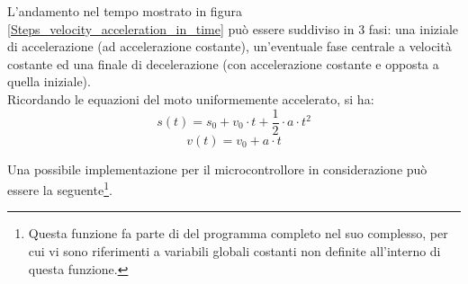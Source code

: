 \documentclass[12pt]{article}
\begin{document}
        \noindent
        L'andamento nel tempo mostrato in figura \ref{Steps_velocity_acceleration_in_time} può essere suddiviso in 3 fasi: una iniziale di accelerazione (ad accelerazione costante), un'eventuale fase centrale a velocità costante ed una finale di decelerazione (con accelerazione costante e opposta a quella iniziale).\\
        
        Ricordando le equazioni del moto uniformemente accelerato, si ha:
        \begin{equation}
            s(t) = s_0 + v_0 \cdot t + \frac{1}{2} \cdot a \cdot t^2
        \end{equation}
        \begin{equation}
            v(t) = v_0 + a \cdot t
        \end{equation}       
        

        \vspace{0.1cm}

        Una possibile implementazione per il microcontrollore in considerazione può essere la seguente\footnote{Questa funzione fa parte di del programma completo nel suo complesso, per cui vi sono riferimenti a variabili globali costanti non definite all'interno di questa funzione.}.
        
\end{document}
